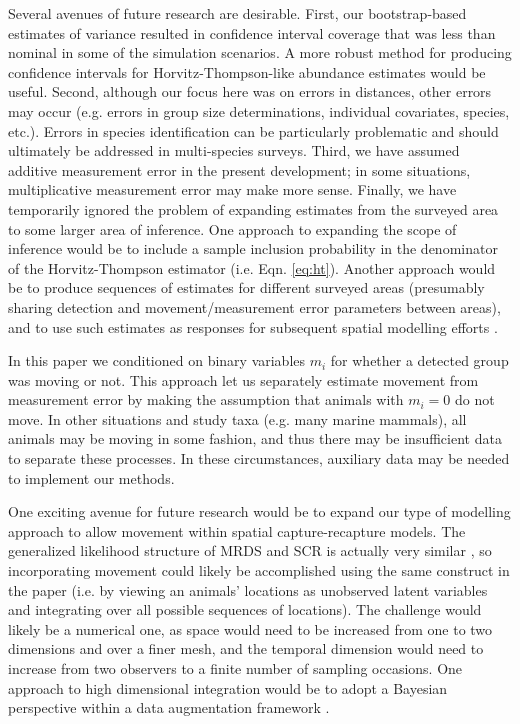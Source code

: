 \documentclass[aoas,preprint]{imsart}
\numberwithin{equation}{section}
\theoremstyle{plain}
\begin{document}
Several avenues of future research are desirable.  First, our bootstrap-based estimates of variance resulted in confidence interval coverage that was less than nominal in some of the simulation scenarios.  A more robust method for producing confidence intervals for Horvitz-Thompson-like abundance estimates would be useful.  Second, although our focus here was on errors in distances, other errors may occur (e.g. errors in group size determinations, individual covariates, species, etc.).  Errors in species identification can be particularly problematic \citep[see e.g.][]{ConnEtAl2014} and should ultimately be addressed in multi-species surveys.  Third, we have assumed additive measurement error in the present development; in some situations, multiplicative measurement error \citep[whereby animals further away are subject to greater measurement error;][]{BorchersEtAl2010} may make more sense.  Finally, we have temporarily ignored the problem of expanding estimates from the surveyed area to some larger area of inference.  One approach to expanding the scope of inference would be to include a sample inclusion probability in the denominator of the Horvitz-Thompson estimator (i.e. Eqn. \ref{eq:ht}).  Another approach would be to produce sequences of estimates for different surveyed areas (presumably sharing detection and movement/measurement error parameters between areas), and to use such estimates as responses for subsequent spatial modelling efforts \citep[see e.g.][]{MillerEtAl2013}.

In this paper we conditioned on binary variables $m_i$ for whether a detected group was moving or not. This approach let us separately estimate movement from measurement error by making the assumption that animals with $m_i=0$ do not move.  In other situations and study taxa (e.g. many marine mammals), all animals may be moving in some fashion, and thus there may be insufficient data to separate these processes.  In these circumstances, auxiliary data \citep[e.g. animals with known location to estimate measurement error; cf.][]{BorchersEtAl2010} may be needed to implement our methods.

One exciting avenue for future research would be to expand our type of modelling approach to allow movement within spatial capture-recapture \citep[SCR; see e.g.][]{BorchersEfford2008,RoyleEtAl2013book} models.  The generalized likelihood structure of MRDS and SCR is actually very similar \citep{BorchersEtAl2015,BorchersMarques2017}, so incorporating movement could likely be accomplished using the same construct in the paper (i.e. by viewing an animals' locations as unobserved latent variables and integrating over all possible sequences of locations).  The challenge would likely be a numerical one, as space would need to be increased from one to two dimensions and over a finer mesh, and the temporal dimension would need to increase from two observers to a finite number of sampling occasions.  One approach to high dimensional integration would be to adopt a Bayesian perspective within a data augmentation framework \citep{RoyleEtAl2007b,ConnEtAl2012}.
\end{document}
